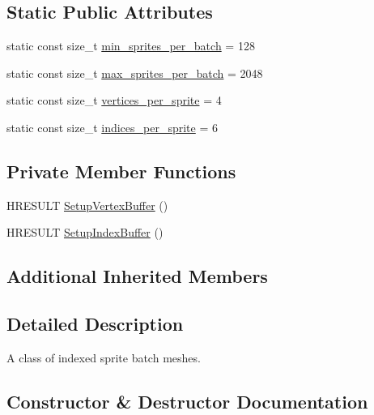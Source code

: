 \subsection*{Static Public Attributes}
\begin{DoxyCompactItemize}
\item 
static const size\+\_\+t \hyperlink{classmage_1_1_sprite_batch_mesh_abf82001c09270c14695bec433cf9810d}{min\+\_\+sprites\+\_\+per\+\_\+batch} = 128
\item 
static const size\+\_\+t \hyperlink{classmage_1_1_sprite_batch_mesh_a562657a44b2b155e8d5496bfe8101ba2}{max\+\_\+sprites\+\_\+per\+\_\+batch} = 2048
\item 
static const size\+\_\+t \hyperlink{classmage_1_1_sprite_batch_mesh_a450088fe9797bc26008ede487b39f0d7}{vertices\+\_\+per\+\_\+sprite} = 4
\item 
static const size\+\_\+t \hyperlink{classmage_1_1_sprite_batch_mesh_aeac9ce4a3a16f212a5bb29f89038110b}{indices\+\_\+per\+\_\+sprite} = 6
\end{DoxyCompactItemize}
\subsection*{Private Member Functions}
\begin{DoxyCompactItemize}
\item 
H\+R\+E\+S\+U\+LT \hyperlink{classmage_1_1_sprite_batch_mesh_a63088254a3c57d61c3992f308c62b138}{Setup\+Vertex\+Buffer} ()
\item 
H\+R\+E\+S\+U\+LT \hyperlink{classmage_1_1_sprite_batch_mesh_a11398d9b698b72d56c4c5ea2f81d18ed}{Setup\+Index\+Buffer} ()
\end{DoxyCompactItemize}
\subsection*{Additional Inherited Members}


\subsection{Detailed Description}
A class of indexed sprite batch meshes. 

\subsection{Constructor \& Destructor Documentation}
\hypertarget{classmage_1_1_sprite_batch_mesh_a7664804b05d08b7126c3efedee5c2588}{}\label{classmage_1_1_sprite_batch_mesh_a7664804b05d08b7126c3efedee5c2588} 
